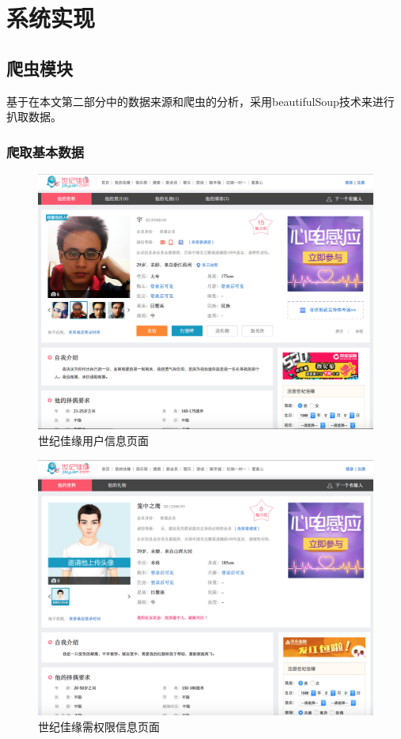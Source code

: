 
\chapter{系统实现}
\section{爬虫模块}
基于在本文第二部分中的数据来源和爬虫的分析，采用beautifulSoup技术来进行扒取数据。
\subsection{爬取基本数据}
\begin{figure}[h]
\includegraphics[width=\textwidth]{img/chap4/jiayuan1.png}
\caption{世纪佳缘用户信息页面\label{Face++API}}
\end{figure}
\begin{figure}[h]
\includegraphics[width=\textwidth]{img/chap4/jiayuan2.png}
\caption{世纪佳缘需权限信息页面\label{Face++API}}
\end{figure}

